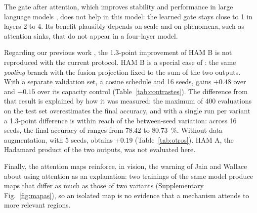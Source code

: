 The gate after attention, which improves stability and performance in large language models \citep{qiu2025gated}, does not help in this model: the learned gate stays close to 1 in layers 2 to 4. Its benefit plausibly depends on scale and on phenomena, such as attention sinks, that do not appear in a four-layer model.

Regarding our previous work \cite{martinez2025reconfiguration}, the 1.3-point improvement of HAM B is not reproduced with the current protocol. HAM B is a special case of : the same \emph{pooling} branch with the fusion projection fixed to the sum of the two outputs. With a separate validation set, a cosine schedule and 16 seeds,  gains $+0.48$ over  and $+0.15$ over its capacity control (Table~\ref{tab:contrastes}). The difference from that result is explained by how it was measured: the maximum of 400 evaluations on the test set overestimates the final accuracy, and with a single run per variant a 1.3-point difference is within reach of the between-seed variation: across 16 seeds, the final accuracy of  ranges from 78.42 to 80.73~\%. Without data augmentation, with 5 seeds,  obtains $+0.19$ (Table~\ref{tab:otros}). HAM A, the Hadamard product of the two outputs, was not evaluated here.

Finally, the attention maps reinforce, in vision, the warning of Jain and Wallace~\cite{jain2019attention} about using attention as an explanation: two trainings of the same model produce maps that differ as much as those of two variants (Supplementary Fig.~\ref{fig:mapas}), so an isolated map is no evidence that a mechanism attends to more relevant regions.

